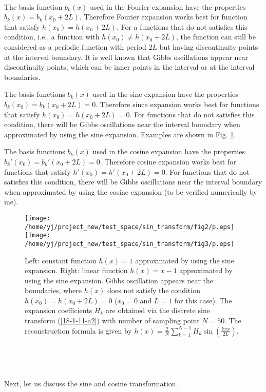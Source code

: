 \documentclass{article}
\begin{document}
\

The basis function $b_k (x)$ used in the Fourier expansion have the
properties $b_k (x) = b_k (x_0 + 2 L)$. Therefore Fourier expansion works best
for function that satisfy $h (x_0) = h (x_0 + 2 L)$. For a functions that do
not satisfies this condition, i.e., a function with $h (x_0) \neq h (x_0 + 2
L)$, the function can still be considered as a periodic function with period
$2 L$ but having discontinuity points at the interval boundary. It is well
known that Gibbs oscillations appear near discontinuity points, which can be
inner points in the interval or at the interval boundaries.

The basis functions $b_k (x)$ used in the sine expansion have the properties
$b_k (x_0) = b_k (x_0 + 2 L) = 0$. Therefore since expansion works best for
functions that satisfy $h (x_0) = h (x_0 + 2 L) = 0$. For functions that do
not satisfies this condition, there will be Gibbs oscillations near the
interval boundary when approximated by using the sine expansion. Examples are
shown in Fig. \ref{18-1-11-a1}.

The basis functions $b_k (x)$ used in the cosine expansion have the properties
$b_k' (x_0) = b_k' (x_0 + 2 L) = 0$. Therefore cosine expansion works best for
functions that satisfy $h' (x_0) = h' (x_0 + 2 L) = 0$. For functions that do
not satisfies this condition, there will be Gibbs oscillations near the
interval boundary when approximated by using the cosine expansion (to be
verified numerically by me).

\begin{figure}[h]
  \texttt{[image: /home/yj/project\_new/test\_space/sin\_transform/fig2/p.eps]}\texttt{[image: /home/yj/project\_new/test\_space/sin\_transform/fig3/p.eps]}
  \caption{\label{18-1-11-a1}Left: constant function $h (x) = 1$ approximated
  by using the sine expansion. Right: linear function $h (x) = x - 1$
  approximated by using the sine expansion. Gibbs oscillation appears near the
  boundaries, where $h (x)$ does not satisfy the condition $h (x_0) = h (x_0 +
  2 L) = 0$ ($x_0 = 0$ and $L = 1$ for this case). The expansion coefficients
  $H_k$ are obtained via the discrete sine transform (\ref{18-1-11-a2}) with
  number of sampling point $N = 50$. The reconstruction formula is given by $h
  (x) = \frac{2}{N} \sum_{k = 1}^{N - 1} H_k \sin( \frac{k \pi x}{2 L}
  )$.}
\end{figure}

\

\

Next, let us discuss the sine and cosine transformation.
\end{document}
